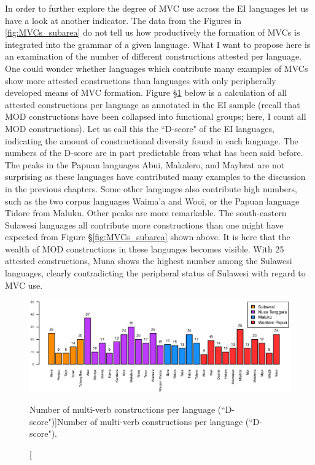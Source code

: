 In order to further explore the degree of MVC use across the EI languages let us have a look at another indicator. The data from the Figures in \ref{fig:MVCs_subarea} do not tell us how productively the formation of MVCs is integrated into the grammar of a given language. What I want to propose here is an examination of the number of different constructions attested per language. One could wonder whether languages which contribute many examples of MVCs show more attested constructions than languages with only peripherally developed means of MVC formation. Figure §\ref{fig:number_types} below is a calculation of all attested constructions per language as annotated in the EI sample (recall that MOD constructions have been collapsed into functional groups; here, I count all MOD constructions). Let us call this the ``D-score" of the EI languages, indicating the amount of constructional diversity found in each language. The numbers of the D-score are in part predictable from what has been said before. The peaks in the Papuan languages Abui, Makalero, and Maybrat are not surprising as these languages have contributed many examples to the discussion in the previous chapters. Some other languages also contribute high numbers, such as the two corpus languages Waima'a and Wooi, or the Papuan language Tidore from Maluku. Other peaks are more remarkable. The south-eastern Sulawesi languages all contribute more constructions than one might have expected from Figure §\ref{fig:MVCs_subarea} shown above. It is here that the wealth of MOD constructions in these languages becomes visible. With 25 attested constructions, Muna shows the highest number among the Sulawesi languages, clearly contradicting the peripheral status of Sulawesi with regard to MVC use.

\begin{figure}
\includegraphics[width=\columnwidth]{figures/MVCs_languages_clean.eps}
\caption[Number of multi-verb constructions per language (``D-score")]{Number of multi-verb constructions per language (``D-score").}\label{fig:number_types}
\end{figure}

